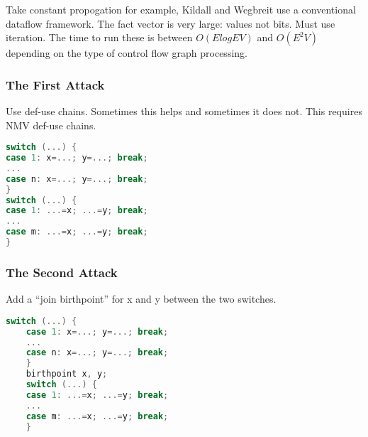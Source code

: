 Take constant propogation for example, Kildall and Wegbreit use a conventional
dataflow framework. The fact vector is very large: values not bits. Must use iteration.
The time to run these is between \(O(ElogEV)\) and
\(O(E^2 V)\) depending on the type of control flow
graph processing.



\subsubsection{The First Attack}


Use def-use chains. Sometimes this helps and sometimes it does not. This requires NMV
def-use chains.

\begin{lstlisting}[language=C,frame=single, caption=An ,label = lst:expr2]
switch (...) {
case 1: x=...; y=...; break;
...
case n: x=...; y=...; break;
}
switch (...) {
case 1: ...=x; ...=y; break;
...
case m: ...=x; ...=y; break;
}
\end{lstlisting}


\subsubsection{The Second Attack }


Add a “join birthpoint”
for x and y between
the two switches. 



\begin{lstlisting}[language=C,frame=single, caption=An ,label = lst:expr2]
    switch (...) {
    case 1: x=...; y=...; break;
    ...
    case n: x=...; y=...; break;
    }
    birthpoint x, y;
    switch (...) {
    case 1: ...=x; ...=y; break;
    ...
    case m: ...=x; ...=y; break;
    }
    \end{lstlisting}